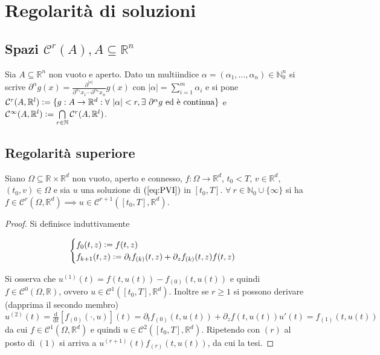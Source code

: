 \documentclass[hidelinks, 10pt]{report}
\begin{document}
\section{Regolarit\`a di soluzioni}
\subsection{Spazi $ \mathcal{C}^{r}(A), A \subseteq \mathbb{R}^{n} $}

Sia $ A \subseteq \mathbb{R}^{n} $ non vuoto e aperto. Dato un multiindice $ \alpha = (\alpha_{1}, \dotsc, \alpha_{n}) \in \mathbb{N}_{0}^{n} $ si scrive $ \partial^{\alpha} g(x) = \frac{\partial^{\vert \alpha \vert}}{\partial^{\alpha_{1}} x_{1} \dotsm \partial^{\alpha_{n}} x_{n}} g(x) $ con $ \vert \alpha \vert = \sum\limits_{i = 1}^{m} \alpha_{i} $ e si pone $ \mathcal{C}^{r}(A, \mathbb{R}^{l}) \vcentcolon= \{ g: A \to \mathbb{R}^{d} : \forall\ \vert \alpha \vert < r, \exists\ \partial^{\alpha} g \text{ ed \`e continua} \} $ e $ \mathcal{C}^{\infty} (A, \mathbb{R}^{l}) \vcentcolon= \bigcap\limits_{r \in \mathbb{N}} \mathcal{C}^{r} (A, \mathbb{R}^{l}) $.

\subsection{Regolarit\`a superiore}	\label{section:11.2}
Siano $ \Omega \subseteq \mathbb{R} \times \mathbb{R}^{d} $ non vuoto, aperto e connesso, $ f: \Omega \to \mathbb{R}^{d} $, $ t_{0} < T $, $ v \in \mathbb{R}^{d} $, $ (t_{0}, v) \in \Omega $ e sia $ u $ una soluzione di $ (\ref{eq:PVI}) $ in $ [t_{0}, T] $. $ \forall\ r \in \mathbb{N}_{0} \cup \{ \infty \} $ si ha $ f \in \mathcal{C}^{r} (\Omega, \mathbb{R}^{d}) \implies u \in \mathcal{C}^{r + 1} ([t_{0}, T], \mathbb{R}^{d}) $.

\begin{proof}
Si definisce induttivamente 

\[
\begin{cases}
f_{0} (t, z) \vcentcolon= f(t, z) \\
f_{k + 1} (t, z) \vcentcolon= \partial_{t} f_{(k)} (t, z) + \partial_{z} f_{(k)} (t, z) f(t, z)
\end{cases}
\]

Si osserva che $ u^{(1)} (t) = f(t, u(t)) - f_{(0)} (t, u(t)) $ e quindi $ f \in \mathcal{C}^{0}(\Omega, \mathbb{R}) $, ovvero $ u \in \mathcal{C}^{1}([t_{0}, T], \mathbb{R}^{d}) $. Inoltre se $ r \ge 1 $ si possono derivare (dapprima il secondo membro) $ u^{(2)} (t) = \frac{\mathrm{d}}{\mathrm{d} t} [f_{(0)} (\cdot, u)] (t) = \partial_{t} f_{(0)} (t, u(t)) + \partial_{z} f(t, u(t)) u'(t) = f_{(1)} (t, u(t)) $ da cui $ f \in \mathcal{C}^{1} (\Omega, \mathbb{R}^{d}) $ e quindi $ u \in \mathcal{C}^{2} ([t_{0}, T], \mathbb{R}^{d}) $. Ripetendo con $ (r) $ al posto di $ (1) $ si arriva a $ u^{(r + 1)} (t)  f_{(r)} (t, u(t)) $, da cui la tesi.
\end{proof}
\end{document}
